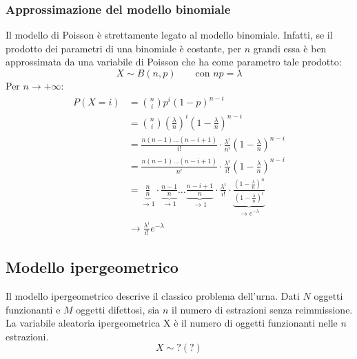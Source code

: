 \subsubsection{Approssimazione del modello binomiale} \label{subsub:binompois}
Il modello di Poisson è strettamente legato al modello binomiale. Infatti, se il prodotto dei parametri di una binomiale è costante, per $n$ grandi essa è ben approssimata da una variabile di Poisson che ha come parametro tale prodotto:
\begin{equation*}
	X\sim B(n, p)\qquad\text{con }np=\lambda
\end{equation*}
Per $n\to+\infty$:
\begin{align*}
	P(X=i) & = \binom{n}{i} p^i (1-p)^{n-i}                                                                                                                                                                                                                                                \\
	       & = \binom{n}{i}\left(\frac{\lambda}{n}\right)^i\left(1-\frac{\lambda}{n}\right)^{n-i}                                                                                                                                                                                          \\
	       & = \frac{n(n-1) \dots (n-i+1)}{i!} \cdot \frac{\lambda^i}{n^i} \left( 1 - \frac{\lambda}{n} \right)^{n-i}                                                                                                                                                                      \\
	       & = \frac{n(n-1) \dots (n-i+1)}{n^i} \cdot \frac{\lambda^i}{i!} \left( 1 - \frac{\lambda}{n} \right)^{n-i}                                                                                                                                                                      \\
	       & = \underbrace{\frac{n}{n}}_{\to 1} \cdot \underbrace{\frac{n-1}{n}}_{\to 1} \dots \underbrace{\frac{n-i+1}{n}}_{\to 1} \cdot \frac{\lambda^i}{i!} \cdot \underbrace{\frac{\left( 1 - \frac{\lambda}{n} \right)^n}{\left( 1 - \frac{\lambda}{n} \right)^i}}_{\to e^{-\lambda}} \\
	       & \to \frac{\lambda^i}{i!} e^{-\lambda}
\end{align*}



\subsection{Modello ipergeometrico}
Il modello ipergeometrico descrive il classico problema dell'urna. Dati $N$ oggetti funzionanti e $M$ oggetti difettosi, sia $n$ il numero di estrazioni senza reimmissione. La variabile aleatoria ipergeometrica X è il numero di oggetti funzionanti nelle $n$ estrazioni.
\begin{equation*}
	X\sim ?(?)
\end{equation*}

